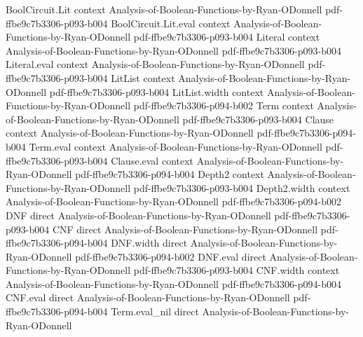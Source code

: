 \begin{theorem}
\leanok
{}
\proofstep
  {BoolCircuit.Lit}
  {context}
  {Analysis-of-Boolean-Functions-by-Ryan-ODonnell}
  {pdf-ffbe9c7b3306-p093-b004}
\proofstep
  {BoolCircuit.Lit.eval}
  {context}
  {Analysis-of-Boolean-Functions-by-Ryan-ODonnell}
  {pdf-ffbe9c7b3306-p093-b004}
\proofstep
  {Literal}
  {context}
  {Analysis-of-Boolean-Functions-by-Ryan-ODonnell}
  {pdf-ffbe9c7b3306-p093-b004}
\proofstep
  {Literal.eval}
  {context}
  {Analysis-of-Boolean-Functions-by-Ryan-ODonnell}
  {pdf-ffbe9c7b3306-p093-b004}
\proofstep
  {LitList}
  {context}
  {Analysis-of-Boolean-Functions-by-Ryan-ODonnell}
  {pdf-ffbe9c7b3306-p093-b004}
\proofstep
  {LitList.width}
  {context}
  {Analysis-of-Boolean-Functions-by-Ryan-ODonnell}
  {pdf-ffbe9c7b3306-p094-b002}
\proofstep
  {Term}
  {context}
  {Analysis-of-Boolean-Functions-by-Ryan-ODonnell}
  {pdf-ffbe9c7b3306-p093-b004}
\proofstep
  {Clause}
  {context}
  {Analysis-of-Boolean-Functions-by-Ryan-ODonnell}
  {pdf-ffbe9c7b3306-p094-b004}
\proofstep
  {Term.eval}
  {context}
  {Analysis-of-Boolean-Functions-by-Ryan-ODonnell}
  {pdf-ffbe9c7b3306-p093-b004}
\proofstep
  {Clause.eval}
  {context}
  {Analysis-of-Boolean-Functions-by-Ryan-ODonnell}
  {pdf-ffbe9c7b3306-p094-b004}
\proofstep
  {Depth2}
  {context}
  {Analysis-of-Boolean-Functions-by-Ryan-ODonnell}
  {pdf-ffbe9c7b3306-p093-b004}
\proofstep
  {Depth2.width}
  {context}
  {Analysis-of-Boolean-Functions-by-Ryan-ODonnell}
  {pdf-ffbe9c7b3306-p094-b002}
\proofstep
  {DNF}
  {direct}
  {Analysis-of-Boolean-Functions-by-Ryan-ODonnell}
  {pdf-ffbe9c7b3306-p093-b004}
\proofstep
  {CNF}
  {direct}
  {Analysis-of-Boolean-Functions-by-Ryan-ODonnell}
  {pdf-ffbe9c7b3306-p094-b004}
\proofstep
  {DNF.width}
  {direct}
  {Analysis-of-Boolean-Functions-by-Ryan-ODonnell}
  {pdf-ffbe9c7b3306-p094-b002}
\proofstep
  {DNF.eval}
  {direct}
  {Analysis-of-Boolean-Functions-by-Ryan-ODonnell}
  {pdf-ffbe9c7b3306-p093-b004}
\proofstep
  {CNF.width}
  {context}
  {Analysis-of-Boolean-Functions-by-Ryan-ODonnell}
  {pdf-ffbe9c7b3306-p094-b004}
\proofstep
  {CNF.eval}
  {direct}
  {Analysis-of-Boolean-Functions-by-Ryan-ODonnell}
  {pdf-ffbe9c7b3306-p094-b004}
\proofstep
  {Term.eval_nil}
  {direct}
  {Analysis-of-Boolean-Functions-by-Ryan-ODonnell}

\end{theorem}
